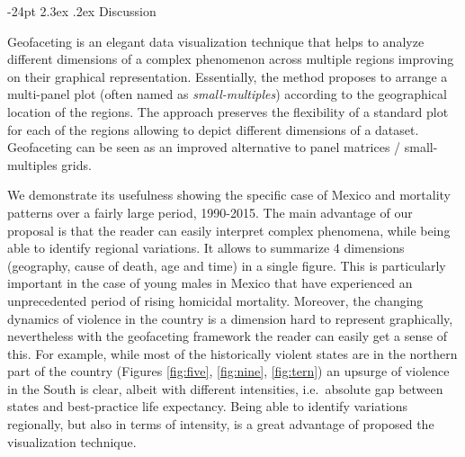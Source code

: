 \documentclass[10pt, twoside, parskip=half]{article}
\makeatletter
\renewcommand\section{\@startsection {section}{1}{\z@}%
                                   {-24pt}%
                                   {2.3ex \@plus.2ex}%
                                   {\normalfont\large\bfseries}}
\makeatother
\begin{document}
\hypertarget{discussion}{%
\section{Discussion}\label{discussion}}

Geofaceting is an elegant data visualization technique that helps to analyze different dimensions of a complex phenomenon across multiple regions improving on their graphical representation. Essentially, the method proposes to arrange a multi-panel plot (often named as \emph{small-multiples}) according to the geographical location of the regions. The approach preserves the flexibility of a standard plot for each of the regions allowing to depict different dimensions of a dataset. Geofaceting can be seen as an improved alternative to panel matrices / small-multiples grids.

We demonstrate its usefulness showing the specific case of Mexico and mortality patterns over a fairly large period, 1990-2015. The main advantage of our proposal is that the reader can easily interpret complex phenomena, while being able to identify regional variations. It allows to summarize 4 dimensions (geography, cause of death, age and time) in a single figure. This is particularly important in the case of young males in Mexico that have experienced an unprecedented period of rising homicidal mortality. Moreover, the changing dynamics of violence in the country is a dimension hard to represent graphically, nevertheless with the geofaceting framework the reader can easily get a sense of this. For example, while most of the historically violent states are in the northern part of the country (Figures \ref{fig:five}, \ref{fig:nine}, \ref{fig:tern}) an upsurge of violence in the South is clear, albeit with different intensities, i.e.~absolute gap between states and best-practice life expectancy. Being able to identify variations regionally, but also in terms of intensity, is a great advantage of proposed the visualization technique.
\end{document}
